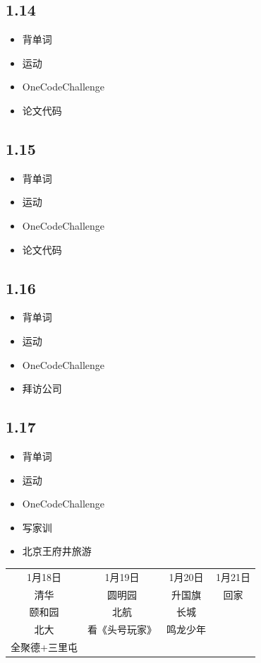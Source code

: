 \documentclass[UTF8]{ctexart}
\begin{document}
\subsection*{1.14}
\begin{itemize}
    \item 背单词
    \item 运动
    \item OneCodeChallenge
    \item 论文代码
\end{itemize}

\subsection*{1.15}
\begin{itemize}
    \item 背单词
    \item 运动
    \item OneCodeChallenge
    \item 论文代码
\end{itemize}

\subsection*{1.16}
\begin{itemize}
    \item 背单词
    \item 运动
    \item OneCodeChallenge
    \item 拜访公司
\end{itemize}

\subsection*{1.17}
\begin{itemize}
    \item 背单词
    \item 运动
    \item OneCodeChallenge
    \item 写家训
    \item 北京王府井旅游
\end{itemize}

\begin{tabular}[pos]{cccc}
    1月18日       & 1月19日        & 1月20日  & 1月21日 \\
    清华          & 圆明园         & 升国旗   & 回家    \\
    颐和园        & 北航           & 长城     &         \\
    北大          & 看《头号玩家》 & 鸣龙少年 &         \\
    全聚德+三里屯 &                &          &
\end{tabular}
\end{document}
